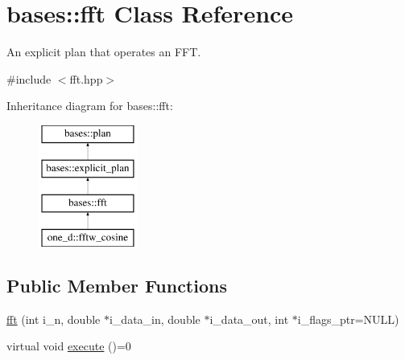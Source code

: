 \hypertarget{classbases_1_1fft}{\section{bases\-:\-:fft Class Reference}
\label{classbases_1_1fft}
}


An explicit plan that operates an F\-F\-T.  




{\ttfamily \#include $<$fft.\-hpp$>$}

Inheritance diagram for bases\-:\-:fft\-:\begin{figure}[H]
\begin{center}
\leavevmode
\includegraphics[height=4.000000cm]{classbases_1_1fft}
\end{center}
\end{figure}
\subsection*{Public Member Functions}
\begin{DoxyCompactItemize}
\item 
\hyperlink{classbases_1_1fft_a84e56922b802575533ede34024d55e8b}{fft} (int i\-\_\-n, double $\ast$i\-\_\-data\-\_\-in, double $\ast$i\-\_\-data\-\_\-out, int $\ast$i\-\_\-flags\-\_\-ptr=N\-U\-L\-L)
\begin{DoxyCompactList}\small\item\em \end{DoxyCompactList}\item 
virtual void \hyperlink{classbases_1_1fft_ae97a792d8538c0362640148f6328d85e}{execute} ()=0
\end{DoxyCompactItemize}
